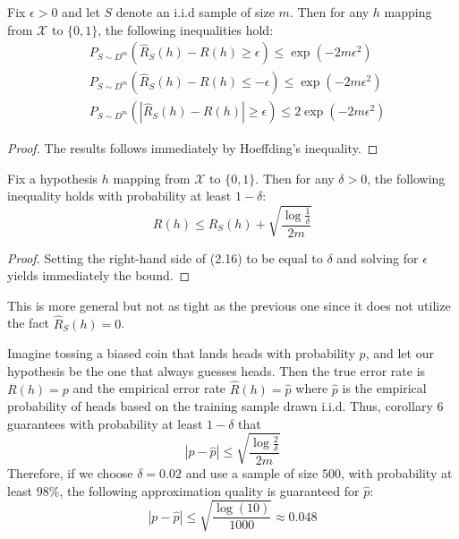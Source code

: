 \begin{corollary}
	Fix $\epsilon > 0$ and let $S$ denote an i.i.d sample of size $m$. Then for any $h$ mapping  from $\mathcal{X}$ to $\{0,1\}$, the following inequalities hold:
	\begin{align}
	& P_{S\sim D^m} (\hat{R}_S (h)-R(h) \geq \epsilon) \leq \exp(-2m\epsilon^2)\\
	& P_{S\sim D^m} (\hat{R}_S (h)-R(h) \leq-\epsilon) \leq \exp(-2m\epsilon^2)\\
	& P_{S\sim D^m} (|\hat{R}_S (h)-R(h)| \geq \epsilon) \leq 2\exp(-2m\epsilon^2)
	\end{align}
	\begin{proof}
		The results follows immediately by Hoeffding's inequality.
	\end{proof}
\end{corollary}

\begin{corollary}
	Fix a hypothesis $h$ mapping  from $\mathcal{X}$ to $\{0,1\}$. Then for any $\delta > 0$, the following inequality holds with probability at least $1-\delta$:
	$$R(h) \leq \hat{R}_S(h) + \sqrt{\frac{\log \frac{1}{\delta}}{2m}}$$
\end{corollary}
\begin{proof}
	Setting the right-hand side of (2.16) to be equal to $\delta$ and solving for $\epsilon$ yields immediately the bound.
\end{proof}
\noindent This is more general but not as tight as the previous one since it does not utilize the fact $\hat{R}_S(h)=0$.\\
\begin{example}
	Imagine tossing a biased coin that lands heads with probability $p$, and let our
	hypothesis be the one that always guesses heads. Then the true error rate is $R(h)=p$
	and the empirical error rate $\hat{R}(h)=\hat{p}$ where $\hat{p}$ is the empirical probability of heads based on the training sample drawn i.i.d. Thus, corollary 6 guarantees with
	probability at least $1-\delta$ that
	\begin{equation}
	|p-\hat{p}| \leq \sqrt{\frac{\log\frac{2}{\delta}}{2m}}
	\end{equation}
	Therefore, if we choose $\delta=0.02$ and use a sample of size $500$, with probability at
	least $98\%$, the following approximation quality is guaranteed for $\hat{p}$:
	\begin{equation}
	|p-\hat{p}| \leq \sqrt{\frac{\log(10)}{1000}} \approx 0.048
	\end{equation}
\end{example}

